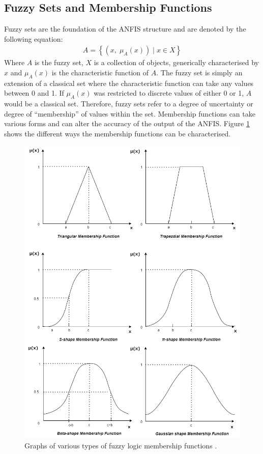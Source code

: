 \subsection{Fuzzy Sets and Membership Functions}\label{membership function}
Fuzzy sets are the foundation of the ANFIS structure and are denoted by the following equation: 
\begin{gather}
A = \left\{ \left(x,\; \mu_A\left(x\right)\right) \;|\; x \in X \right\}
\end{gather}
Where $A$ is the fuzzy set, $X$ is a collection of objects, generically characterised by $x$ and $\mu_A(x)$ is the characteristic function of $A$. The fuzzy set is simply an extension of a classical set where the characteristic function can take any values between 0 and 1. If $\mu_A(x)$ was restricted to discrete values of either 0 or 1, $A$ would be a classical set. Therefore, fuzzy sets refer to a degree of uncertainty or degree of ``membership'' of values within the set. Membership functions can take various forms and can alter the accuracy of the output of the ANFIS. Figure \ref{fig:types_mf} shows the different ways the membership functions can be characterised. 
\begin{figure}[H]
    \centering
    \includegraphics[width = 0.7 \textwidth]{img/membershipfunctions.png}
    \caption[Graphs of various types of fuzzy logic membership functions.]{Graphs of various types of fuzzy logic membership functions \cite{zain5}.}
    \label{fig:types_mf}
\end{figure}
